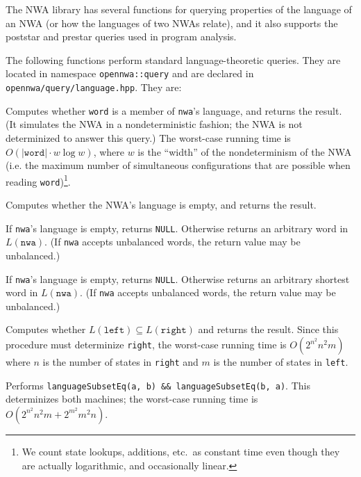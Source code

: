 The NWA library has several functions for querying
properties of the language of an NWA (or how the languages of two NWAs
relate), and it also supports
the poststar and prestar queries used in program analysis.

The following functions perform standard language-theoretic queries. They are
located in namespace \texttt{opennwa::query} and are declared in
\texttt{opennwa/query/language.hpp}. They are:
\clearpage
\begin{functionlist}
    Computes whether \texttt{word} is a member of
    \texttt{nwa}'s language, and returns the result. (It simulates the
    NWA in a nondeterministic fashion; the NWA is not determinized to answer
    this query.) The worst-case running time is
    $O(|\texttt{word}|\cdot w\log w)$, where $w$ is the ``width'' of
    the nondeterminism of the NWA (i.e. the maximum number of
    simultaneous configurations that are possible when reading \texttt{word})\footnote{We count
      state lookups, additions, etc.\ as constant time even though they are
      actually logarithmic, and occasionally linear.}.
    
    Computes
    whether the NWA's language is empty, and returns the result.

    If \texttt{nwa}'s language is empty, returns \texttt{NULL}. Otherwise
    returns an arbitrary word in $L(\texttt{nwa})$. (If \texttt{nwa} accepts
    unbalanced words, the return value may be unbalanced.)

    If \texttt{nwa}'s language is empty, returns \texttt{NULL}. Otherwise
    returns an arbitrary shortest word in $L(\texttt{nwa})$. (If \texttt{nwa} accepts
    unbalanced words, the return value may be unbalanced.)

    Computes whether $L(\texttt{left}) \subseteq L(\texttt{right})$
    and returns the result. Since this procedure must determinize \texttt{right},
    the worst-case running time is $O(2^{n^2}n^2m)$ where $n$ is the number of
    states in \texttt{right} and $m$ is the number of states in \texttt{left}.

    Performs \texttt{languageSubsetEq(a, b) \&\&
    languageSubsetEq(b, a)}. This determinizes both machines; the
    worst-case running time is $O(2^{n^2}n^2m + 2^{m^2}m^2n)$.
\end{functionlist}


